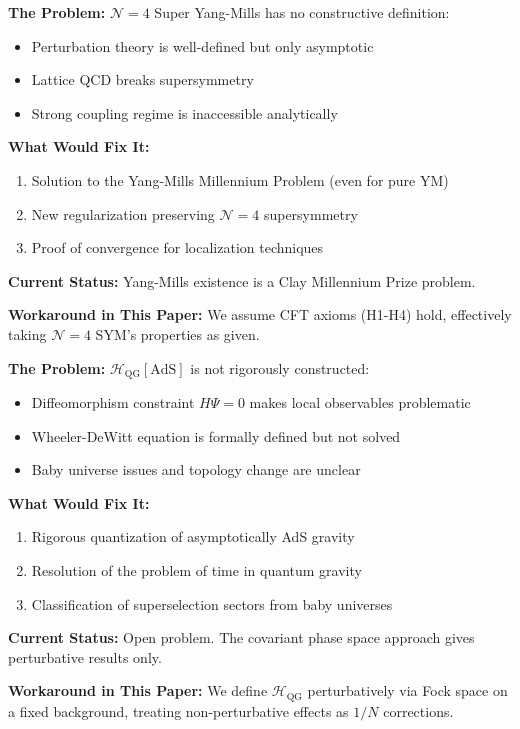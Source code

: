 \documentclass[12pt,a4paper]{article}
\begin{document}
\begin{gapbox}[title={Gap A2: Non-Perturbative Gauge Theory}]
\textbf{The Problem:} $\mathcal{N}=4$ Super Yang-Mills has no constructive definition:
\begin{itemize}
    \item Perturbation theory is well-defined but only asymptotic
    \item Lattice QCD breaks supersymmetry
    \item Strong coupling regime is inaccessible analytically
\end{itemize}

\textbf{What Would Fix It:}
\begin{enumerate}
    \item Solution to the Yang-Mills Millennium Problem (even for pure YM)
    \item New regularization preserving $\mathcal{N}=4$ supersymmetry
    \item Proof of convergence for localization techniques
\end{enumerate}

\textbf{Current Status:} Yang-Mills existence is a Clay Millennium Prize problem.

\textbf{Workaround in This Paper:} We assume CFT axioms (H1-H4) hold, effectively taking $\mathcal{N}=4$ SYM's properties as given.
\end{gapbox}

\begin{gapbox}[title={Gap A3: Quantum Gravity Hilbert Space}]
\textbf{The Problem:} $\mathcal{H}_{\text{QG}}[\text{AdS}]$ is not rigorously constructed:
\begin{itemize}
    \item Diffeomorphism constraint $H\Psi = 0$ makes local observables problematic
    \item Wheeler-DeWitt equation is formally defined but not solved
    \item Baby universe issues and topology change are unclear
\end{itemize}

\textbf{What Would Fix It:}
\begin{enumerate}
    \item Rigorous quantization of asymptotically AdS gravity
    \item Resolution of the problem of time in quantum gravity
    \item Classification of superselection sectors from baby universes
\end{enumerate}

\textbf{Current Status:} Open problem. The covariant phase space approach gives perturbative results only.

\textbf{Workaround in This Paper:} We define $\mathcal{H}_{\text{QG}}$ perturbatively via Fock space on a fixed background, treating non-perturbative effects as $1/N$ corrections.
\end{gapbox}
\end{document}
